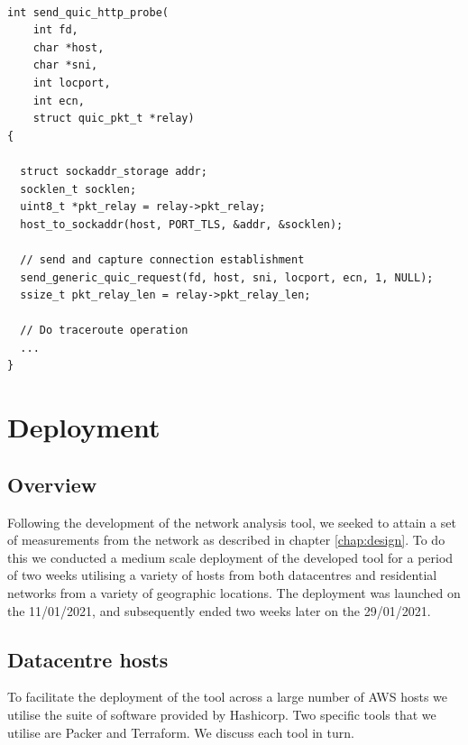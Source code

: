 \documentclass{l4proj}
\begin{document}
\begin{lstlisting}[caption={A demonstration of launching traceroutes under Quic, leveraging support from lsquic to generate a suitable connection establishment packet, which is then utilised under a standard traceroute operation. The use of synchronisation primitives and error checking have been removed for the sake of brevity.}]

int send_quic_http_probe(
    int fd, 
    char *host, 
    char *sni, 
    int locport, 
    int ecn, 
    struct quic_pkt_t *relay)
{
  
  struct sockaddr_storage addr;
  socklen_t socklen;
  uint8_t *pkt_relay = relay->pkt_relay;
  host_to_sockaddr(host, PORT_TLS, &addr, &socklen);
  
  // send and capture connection establishment
  send_generic_quic_request(fd, host, sni, locport, ecn, 1, NULL);
  ssize_t pkt_relay_len = relay->pkt_relay_len;
  
  // Do traceroute operation
  ... 
}

\end{lstlisting}

\section{Deployment}


\subsection{Overview}

Following the development of the network analysis tool, we seeked to attain a set of measurements from the network as described in chapter \ref{chap:design}. To do this we conducted a medium scale deployment of the developed tool for a period of two weeks utilising a variety of hosts from both datacentres and residential networks from a variety of geographic locations. The deployment was launched on the 11/01/2021, and subsequently ended two weeks later on the 29/01/2021.


\subsection{Datacentre hosts}

To facilitate the deployment of the tool across a large number of AWS hosts we utilise the suite of software provided by Hashicorp. Two specific tools that we utilise are Packer and Terraform. We discuss each tool in turn.
\end{document}
